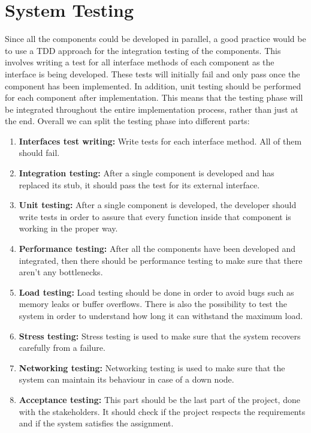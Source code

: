 \section{System Testing}
\label{sec:systemTesting}%
Since all the components could be developed in parallel, a good practice would be to use a TDD approach for the integration testing of the components. This involves writing a test for all interface methods of each component as the interface is being developed. These tests will initially fail and only pass once the component has been implemented. In addition, unit testing should be performed for each component after implementation. This means that the testing phase will be integrated throughout the entire implementation process, rather than just at the end.
Overall we can split the testing phase into different parts:
\begin{enumerate}
    \item \textbf{Interfaces test writing: }Write tests for each interface method. All of them should fail.
    \item \textbf{Integration testing: }After a single component is developed and has replaced its stub, it should pass the test for its external interface.
    \item \textbf{Unit testing: }After a single component is developed, the developer should write tests in order to assure that every function inside that component is working in the proper way.
    \item \textbf{Performance testing: }After all the components have been developed and integrated, then there should be performance testing to make sure that there aren't any bottlenecks.
    \item \textbf{Load testing: }Load testing should be done in order to avoid bugs such as memory leaks or buffer overflows. There is also the possibility to test the system in order to understand how long it can withstand the maximum load.
    \item \textbf{Stress testing: }Stress testing is used to make sure that the system recovers carefully from a failure.
    \item \textbf{Networking testing: }Networking testing is used to make sure that the system can maintain its behaviour in case of a down node.
    \item \textbf{Acceptance testing: }This part should be the last part of the project, done with the stakeholders. It should check if the project respects the requirements and if the system satisfies the assignment.
\end{enumerate}